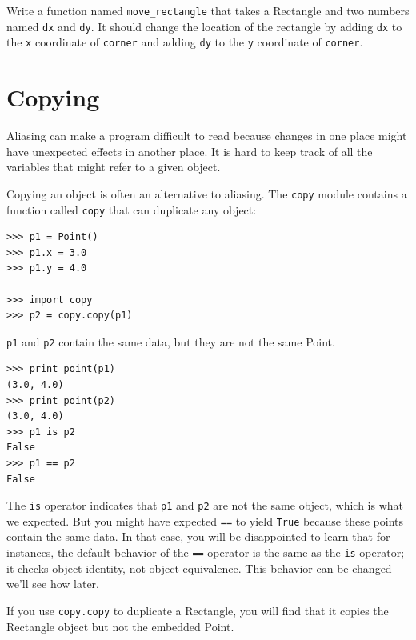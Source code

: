 \documentclass[10pt]{book}
\begin{document}
\begin{ex}
Write a function named \verb"move_rectangle" that takes
a Rectangle and two numbers named {\tt dx} and {\tt dy}.  It
should change the location of the rectangle by adding {\tt dx}
to the {\tt x} coordinate of {\tt corner} and adding {\tt dy}
to the {\tt y} coordinate of {\tt corner}.
\end{ex}


\section{Copying}


Aliasing can make a program difficult to read because changes
in one place might have unexpected effects in another place.
It is hard to keep track of all the variables that might refer
to a given object.


Copying an object is often an alternative to aliasing.
The {\tt copy} module contains a function called {\tt copy} that
can duplicate any object:

\beforeverb
\begin{verbatim}
>>> p1 = Point()
>>> p1.x = 3.0
>>> p1.y = 4.0

>>> import copy
>>> p2 = copy.copy(p1)
\end{verbatim}
\afterverb
%
{\tt p1} and {\tt p2} contain the same data, but they are
not the same Point.

\beforeverb
\begin{verbatim}
>>> print_point(p1)
(3.0, 4.0)
>>> print_point(p2)
(3.0, 4.0)
>>> p1 is p2
False
>>> p1 == p2
False
\end{verbatim}
\afterverb
%
The {\tt is} operator indicates that {\tt p1} and {\tt p2} are not the
same object, which is what we expected.  But you might have expected
{\tt ==} to yield {\tt True} because these points contain the same
data.  In that case, you will be disappointed to learn that for
instances, the default behavior of the {\tt ==} operator is the same
as the {\tt is} operator; it checks object identity, not object
equivalence.  This behavior can be changed---we'll see how later.


If you use {\tt copy.copy} to duplicate a Rectangle, you will find
that it copies the Rectangle object but not the embedded Point.
\end{document}
